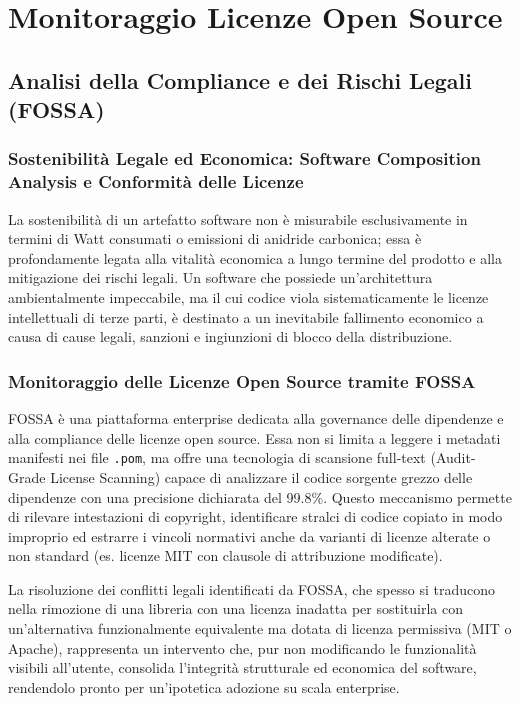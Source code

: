 \chapter{Monitoraggio Licenze Open Source}

\section{Analisi della Compliance e dei Rischi Legali (FOSSA)}

\subsection{Sostenibilità Legale ed Economica: Software Composition Analysis e Conformità delle Licenze}

La sostenibilità di un artefatto software non è misurabile esclusivamente in termini di Watt consumati o emissioni di anidride carbonica; essa è profondamente legata alla vitalità economica a lungo termine del prodotto e alla mitigazione dei rischi legali. Un software che possiede un'architettura ambientalmente impeccabile, ma il cui codice viola sistematicamente le licenze intellettuali di terze parti, è destinato a un inevitabile fallimento economico a causa di cause legali, sanzioni e ingiunzioni di blocco della distribuzione.

\subsection{Monitoraggio delle Licenze Open Source tramite FOSSA}

FOSSA è una piattaforma enterprise dedicata alla governance delle dipendenze e alla compliance delle licenze open source. Essa non si limita a leggere i metadati manifesti nei file \texttt{.pom}, ma offre una tecnologia di scansione full-text (Audit-Grade License Scanning) capace di analizzare il codice sorgente grezzo delle dipendenze con una precisione dichiarata del 99.8\%. Questo meccanismo permette di rilevare intestazioni di copyright, identificare stralci di codice copiato in modo improprio ed estrarre i vincoli normativi anche da varianti di licenze alterate o non standard (es. licenze MIT con clausole di attribuzione modificate). 

La risoluzione dei conflitti legali identificati da FOSSA, che spesso si traducono nella rimozione di una libreria con una licenza inadatta per sostituirla con un'alternativa funzionalmente equivalente ma dotata di licenza permissiva (MIT o Apache), rappresenta un intervento che, pur non modificando le funzionalità visibili all'utente, consolida l'integrità strutturale ed economica del software, rendendolo pronto per un'ipotetica adozione su scala enterprise.

